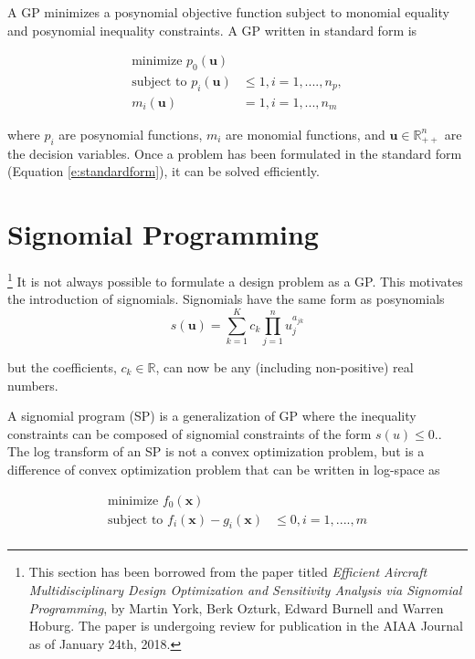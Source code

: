 A GP minimizes a posynomial objective function subject to monomial equality and
posynomial inequality constraints. A GP written in standard form is

\begin{equation}
\label{e:standardform}
\begin{aligned}
\text{minimize }p_{0}(\mathbf{u})& \\
\text{subject to }p_{i}(\mathbf{u})& \leq 1, i = 1, ...., n_{p}, \\
m_{i}(\mathbf{u})& = 1, i = 1, ..., n_{m}
\end{aligned}
\end{equation}

where $p_{i}$ are posynomial functions, $m_{i}$ are monomial functions, and
$\mathbf{u} \in \mathbb{R}^n_{++}$ are the decision variables. Once a problem
has been formulated in the standard form (Equation \ref{e:standardform}), it can
be solved efficiently.

\section{Signomial Programming}\footnote{This section has been borrowed from the paper
titled \textit{Efficient Aircraft Multidisciplinary Design Optimization and Sensitivity Analysis via Signomial Programming},
by Martin York, Berk Ozturk, Edward Burnell and Warren Hoburg.
The paper is undergoing review for publication in the AIAA Journal as of January 24th, 2018. }
\label{a:spintro}
It is not always possible to formulate a design problem as a GP. This motivates
the introduction of signomials. Signomials have the same form as posynomials
\begin{equation}\label{e:signomial}
s(\mathbf{u}) = \sum_{k=1}^{K}c_{k}\prod_{j=1}^{n} u_{j}^{a_{jk}}
\end{equation}

but the coefficients, $c_{k} \in \mathbb{R}$, can now be any (including
non-positive) real numbers.

A signomial program (SP) is a generalization of GP where the inequality
constraints can be composed of signomial constraints of the form $s(u) \leq 0$..
The log transform of an SP is not a convex optimization problem, but is a
difference of convex optimization problem that can be written in log-space as

\begin{equation}
\begin{aligned}
\text{minimize }f_{0}(\mathbf{x})& \\
\text{subject to }f_{i}(\mathbf{x}) -  g_{i}(\mathbf{x})& \leq 0, i = 1, ...., m
\\
\end{aligned}
\end{equation}

